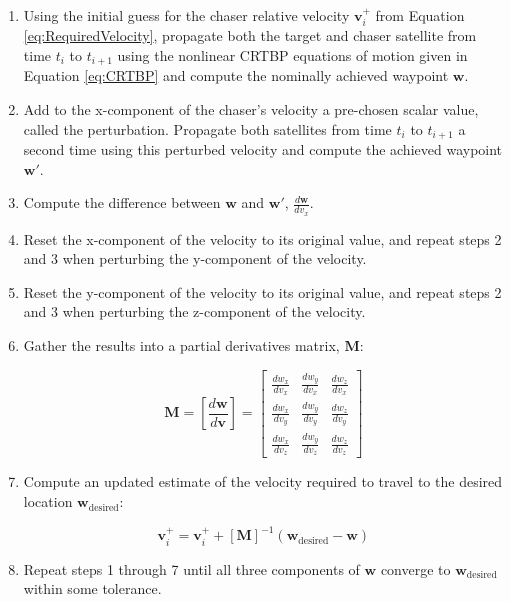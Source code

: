 \documentclass[a4paper]{article}
\begin{document}
\begin{enumerate}[leftmargin=!,labelindent=12pt,itemindent=0pt, label=Step \arabic*:]

	\item Using the initial guess for the chaser relative velocity \(\mathbf{v}_i^+\) from Equation \ref{eq:RequiredVelocity}, propagate both the target and chaser satellite from time \(t_i\) to \(t_{i+1}\) using the nonlinear CRTBP equations of motion given in Equation \ref{eq:CRTBP} and compute the nominally achieved waypoint \(\mathbf{w}\).
	
	\item Add to the x-component of the chaser's velocity a pre-chosen scalar value, called the perturbation.  Propagate both satellites from time \(t_i\) to \(t_{i+1}\) a second time using this perturbed velocity and compute the achieved waypoint \(\mathbf{w}'\).
	
	\item Compute the difference between \(\mathbf{w}\) and \(\mathbf{w}'\), \(\frac{d\mathbf{w}}{dv_x}\).
	
	\item Reset the x-component of the velocity to its original value, and repeat steps 2 and 3 when perturbing the y-component of the velocity.
	
	\item Reset the y-component of the velocity to its original value, and repeat steps 2 and 3 when perturbing the z-component of the velocity.
	
	\item Gather the results into a partial derivatives matrix, \(\mathbf{M}\):
	
	\begin{equation} \label{eq:ShootingMethodPartialDerivs}
	\mathbf{M} = \left[ \frac{d\mathbf{w}}{d\mathbf{v}} \right]
	= \begin{bmatrix}
	\frac{dw_x}{dv_x} & \frac{dw_y}{dv_x} & \frac{dw_z}{dv_x} \\[0.3em]
	\frac{dw_x}{dv_y} & \frac{dw_y}{dv_y} & \frac{dw_z}{dv_y} \\[0.3em]
	\frac{dw_x}{dv_z} & \frac{dw_y}{dv_z} & \frac{dw_z}{dv_z}
	\end{bmatrix}
	\end{equation}
	
	\item Compute an updated estimate of the velocity required to travel to the desired location \(\mathbf{w}_{\mathrm{desired}}\):
	
	\begin{equation} \label{eq:ShootingMethodUpdate}
	\mathbf{v}_i^+ = \mathbf{v}_i^+ + [\mathbf{M}]^{-1}(\mathbf{w}_{\mathrm{desired}} - \mathbf{w})
	\end{equation}
	
	\item Repeat steps 1 through 7 until all three components of \(\mathbf{w}\) converge to \(\mathbf{w}_{\mathrm{desired}}\) within some tolerance.
	
\end{enumerate}
\end{document}
